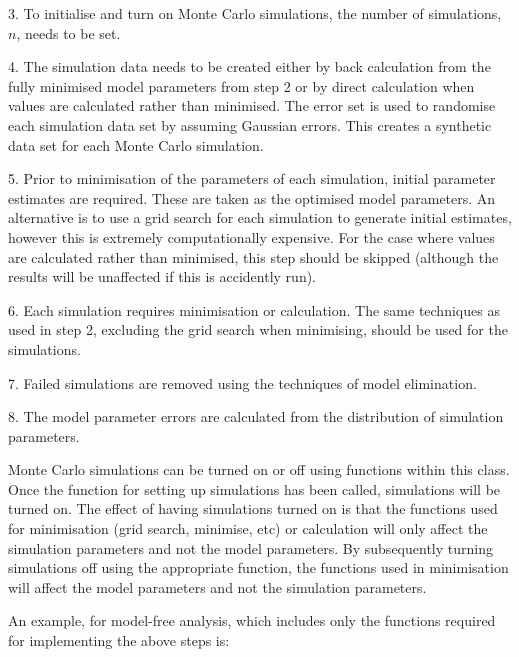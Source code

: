 3.  To initialise and turn on Monte Carlo simulations, the number of simulations, $n$, needs
to be set.

4.  The simulation data needs to be created either by back calculation from the fully
minimised  model parameters from step 2 or by direct calculation when values are calculated
rather than minimised.   The error set is used to randomise each simulation data set by
assuming Gaussian errors.  This creates a synthetic data set for each Monte Carlo
simulation.

5.  Prior to minimisation  of the parameters of each simulation, initial parameter estimates
are required.  These are taken as the optimised  model parameters.  An alternative is to use
a grid search for each simulation to generate initial estimates, however this is extremely
computationally expensive.  For the case where values are calculated rather than minimised, 
this step should be skipped (although the results will be unaffected if this is accidently
run).

6.  Each simulation requires minimisation  or calculation.  The same techniques as used in
step 2, excluding the grid search when minimising, should be used for the simulations.

7.  Failed simulations are removed using the techniques of model elimination.  

8.  The model parameter errors are calculated from the distribution of simulation
parameters.


Monte Carlo simulations can be turned on or off using functions within this class.  Once the
function for setting up simulations has been called, simulations will be turned on.  The
effect of having simulations turned on is that the functions used for minimisation  (grid
search, minimise,  etc) or calculation will only affect the simulation parameters and not the
model parameters.  By subsequently turning simulations off using the appropriate function,
the functions used in minimisation  will affect the model parameters and not the simulation
parameters.


An example, for model-free analysis, which includes only the functions required for
implementing the above steps is:


